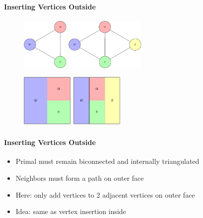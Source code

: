 \documentclass[t,18pt]{beamer}
\begin{document}
\begin{frame}[c]
  \frametitle{}
  \framesubtitle{Inserting Vertices Outside}
  \begin{figure}
    \qquad
    \includegraphics[height=2.5cm]{../Thesis/Resources/InsertVertex-Example-Outside-1.pdf}
    \quad
    \includegraphics[height=2.5cm]{../Thesis/Resources/InsertVertex-Example-Outside-2.pdf}
  \end{figure}
  \begin{figure}
    \includegraphics[height=2.5cm]{../Thesis/Resources/InsertVertex-Example-Outside-3.pdf}
    \qquad
    \includegraphics[height=2.5cm]{../Thesis/Resources/InsertVertex-Example-Outside-4.pdf}
  \end{figure}
\end{frame}

\begin{frame}
  \frametitle{}
  \framesubtitle{Inserting Vertices Outside}
  \begin{itemize}
    \item Primal must remain biconnected and internally triangulated
    \item Neighbors must form a path on outer face
    \item Here: only add vertices to 2 adjacent vertices on outer face
    \vspace{1cm}
    \item<2-> Idea: same as vertex insertion inside
  \end{itemize}
\end{frame}
\end{document}
